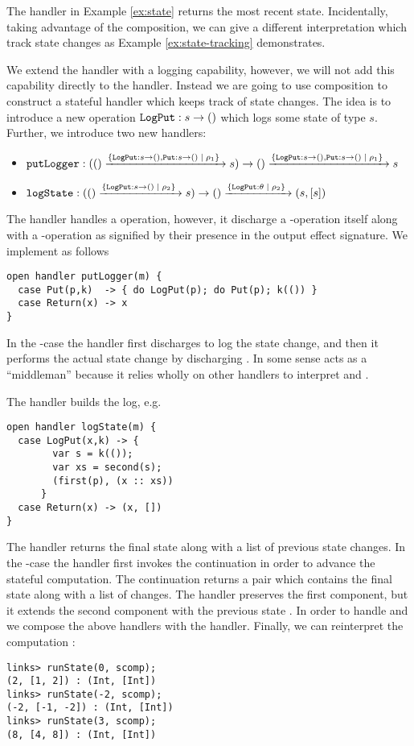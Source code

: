 The  handler in Example \ref{ex:state} returns the most recent state. Incidentally, taking advantage of the composition, we can give a different interpretation which track state changes as Example \ref{ex:state-tracking} demonstrates. 
\begin{example}\label{ex:state-tracking}
We extend the  handler with a logging capability, however, we will not add this capability directly to the handler. Instead we are going to use composition to construct a stateful handler which keeps track of state changes. The idea is to introduce a new operation $\texttt{LogPut} : s \to ()$ which logs some state of type $s$. Further, we introduce two new handlers:
\begin{itemize}
  \item $\texttt{putLogger} : (() \xrightarrow{ \{\texttt{LogPut}: s \to (), \texttt{Put}:s \to () \; | \; \rho_1\}\;} s) \to () \xrightarrow{ \{ \texttt{LogPut}: s \to (),\texttt{Put}:s \to () \; | \; \rho_1\}\;} s$
  \item $\texttt{logState} : (() \xrightarrow{\{ \texttt{LogPut}: s \to () \; | \; \rho_2\}\;} s) \to () \xrightarrow{\{\texttt{LogPut}:\theta \; | \; \rho_2 \}\;} (s, [s])$
\end{itemize}
The  handler handles a  operation, however, it discharge a -operation itself along with a -operation as signified by their presence in the output effect signature.
We implement  as follows
\begin{lstlisting}[style=links]
open handler putLogger(m) {
  case Put(p,k)  -> { do LogPut(p); do Put(p); k(()) }
  case Return(x) -> x
}
\end{lstlisting}
In the -case the handler first discharges  to log the state change, and then it performs the actual state change by discharging . In some sense  acts as a ``middleman'' because it relies wholly on other handlers to interpret  and .

The  handler builds the log, e.g.
\begin{lstlisting}[style=links]
open handler logState(m) {
  case LogPut(x,k) -> { 
        var s = k(());
        var xs = second(s);
        (first(p), (x :: xs))
      }
  case Return(x) -> (x, [])			 
}
\end{lstlisting}
The handler returns the final state along with a list of previous state changes. In the -case the handler first invokes the continuation in order to advance the stateful computation. The continuation returns a pair which contains the final state along with a list of changes. The handler preserves the first component, but it extends the second component with the previous state .
In order to handle  and  we compose the above handlers with the  handler. Finally, we can reinterpret the computation :
\begin{lstlisting}[style=links]
links> runState(0, scomp);
(2, [1, 2]) : (Int, [Int])
links> runState(-2, scomp);
(-2, [-1, -2]) : (Int, [Int])
links> runState(3, scomp);
(8, [4, 8]) : (Int, [Int])
\end{lstlisting}
\end{example}
